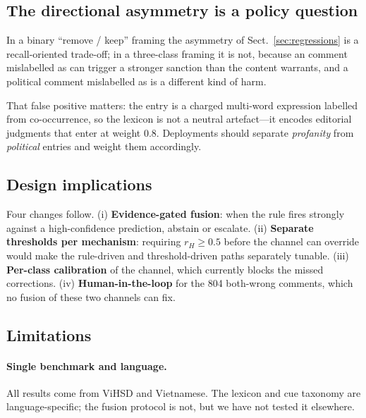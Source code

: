 \subsection{The directional asymmetry is a policy question}

\label{sec:asymmetry}

In a binary ``remove / keep'' framing the asymmetry of
Sect.~\ref{sec:regressions} is a recall-oriented trade-off; in a three-class
framing it is not, because an \off{} comment mislabelled as \hate{} can trigger
a stronger sanction than the content warrants, and a political comment
mislabelled as \hate{} is a different kind of harm.

That false positive matters: the entry is a charged multi-word expression
labelled \hate{} from co-occurrence, so the lexicon is not a neutral
artefact---it encodes editorial judgments that enter at weight 0.8. Deployments
should separate \emph{profanity} from \emph{political} entries and weight them
accordingly.

\subsection{Design implications}

\label{sec:implications}

Four changes follow. (i) \textbf{Evidence-gated fusion}: when the rule fires
strongly against a high-confidence \clean{} prediction, abstain or escalate.
(ii) \textbf{Separate thresholds per mechanism}: requiring $r_H\ge0.5$ before
the \hate{} channel can override would make the rule-driven and
threshold-driven paths separately tunable. (iii) \textbf{Per-class calibration}
of the \clean{} channel, which currently blocks the missed corrections. (iv)
\textbf{Human-in-the-loop} for the 804 both-wrong comments, which no fusion of
these two channels can fix.

\subsection{Limitations}

\label{sec:limitations}

\paragraph{Single benchmark and language.}
All results come from ViHSD and Vietnamese. The lexicon and cue taxonomy are
language-specific; the fusion protocol is not, but we have not tested it
elsewhere.

